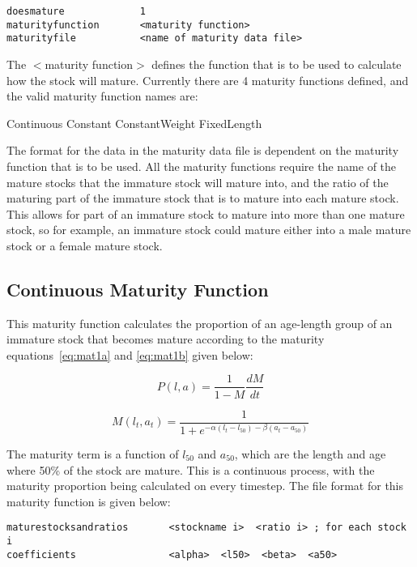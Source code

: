 \documentclass [a4paper, 10pt]{book}
\begin{document}
{\small\begin{verbatim}
doesmature             1
maturityfunction       <maturity function>
maturityfile           <name of maturity data file>
\end{verbatim}}

The $<$maturity function$>$ defines the function that is to be used to calculate how the stock will mature.  Currently there are 4 maturity functions defined, and the valid maturity function names are:

\bigskip
Continuous\newline
Constant\newline
ConstantWeight\newline
FixedLength

\bigskip
The format for the data in the maturity data file is dependent on the maturity function that is to be used.  All the maturity functions require the name of the mature stocks that the immature stock will mature into, and the ratio of the maturing part of the immature stock that is to mature into each mature stock.  This allows for part of an immature stock to mature into more than one mature stock, so for example, an immature stock could mature either into a male mature stock or a female mature stock.

\subsection{Continuous Maturity Function}
This maturity function calculates the proportion of an age-length group of an immature stock that becomes mature according to the maturity equations~\ref{eq:mat1a} and \ref{eq:mat1b} given below:

\begin{equation}\label{eq:mat1a}
P(l, a) = {\frac{1}{1 - M}}{\frac{dM}{dt}}
\end{equation}

\begin{equation}\label{eq:mat1b}
M(l_{t},a_{t}) = \frac{1}{1 + e^{-\alpha(l_{t} - l_{50}) - \beta(a_{t} - a_{50})}}
\end{equation}

\bigskip
The maturity term is a function of $l_{50}$ and $a_{50}$, which are the length and age where 50\% of the stock are mature.  This is a continuous process, with the maturity proportion being calculated on every timestep.  The file format for this maturity function is given below:

{\small\begin{verbatim}
maturestocksandratios       <stockname i>  <ratio i> ; for each stock i
coefficients                <alpha>  <l50>  <beta>  <a50>
\end{verbatim}}
\end{document}
